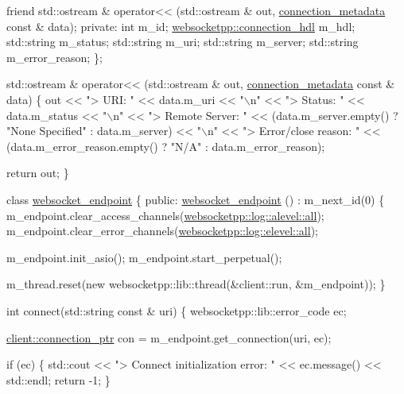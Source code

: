 \begin{DoxyCode}
    \textcolor{keyword}{friend} std::ostream & operator<< (std::ostream & out, \hyperlink{classconnection__metadata}{connection\_metadata} \textcolor{keyword}{const} & 
      data);
\textcolor{keyword}{private}:
    \textcolor{keywordtype}{int} m\_id;
    \hyperlink{namespacewebsocketpp_a6b3d26a10ee7229b84b776786332631d}{websocketpp::connection\_hdl} m\_hdl;
    std::string m\_status;
    std::string m\_uri;
    std::string m\_server;
    std::string m\_error\_reason;
\};

std::ostream & operator<< (std::ostream & out, \hyperlink{classconnection__metadata}{connection\_metadata} \textcolor{keyword}{const} & data) \{
    out << \textcolor{stringliteral}{"> URI: "} << data.m\_uri << \textcolor{stringliteral}{"\(\backslash\)n"}
        << \textcolor{stringliteral}{"> Status: "} << data.m\_status << \textcolor{stringliteral}{"\(\backslash\)n"}
        << \textcolor{stringliteral}{"> Remote Server: "} << (data.m\_server.empty() ? \textcolor{stringliteral}{"None Specified"} : data.m\_server) << \textcolor{stringliteral}{"\(\backslash\)n"}
        << \textcolor{stringliteral}{"> Error/close reason: "} << (data.m\_error\_reason.empty() ? \textcolor{stringliteral}{"N/A"} : data.m\_error\_reason);

    \textcolor{keywordflow}{return} out;
\}

\textcolor{keyword}{class }\hyperlink{classwebsocket__endpoint}{websocket\_endpoint} \{
\textcolor{keyword}{public}:
    \hyperlink{classwebsocket__endpoint}{websocket\_endpoint} () : m\_next\_id(0) \{
        m\_endpoint.clear\_access\_channels(\hyperlink{structwebsocketpp_1_1log_1_1alevel_a853aa0b8976e53f3181af3bc398d493e}{websocketpp::log::alevel::all});
        m\_endpoint.clear\_error\_channels(\hyperlink{structwebsocketpp_1_1log_1_1elevel_a9b31ff708c221d314f9f4eb3ff2b1ad7}{websocketpp::log::elevel::all});

        m\_endpoint.init\_asio();
        m\_endpoint.start\_perpetual();

        m\_thread.reset(\textcolor{keyword}{new} websocketpp::lib::thread(&client::run, &m\_endpoint));
    \}

    \textcolor{keywordtype}{int} connect(std::string \textcolor{keyword}{const} & uri) \{
        websocketpp::lib::error\_code ec;

        \hyperlink{classwebsocketpp_1_1client_a2e187bbb2beac676bbfbc2e8065de83e}{client::connection\_ptr} con = m\_endpoint.get\_connection(uri, ec);

        \textcolor{keywordflow}{if} (ec) \{
            std::cout << \textcolor{stringliteral}{"> Connect initialization error: "} << ec.message() << std::endl;
            \textcolor{keywordflow}{return} -1;
        \}


\end{DoxyCode}
